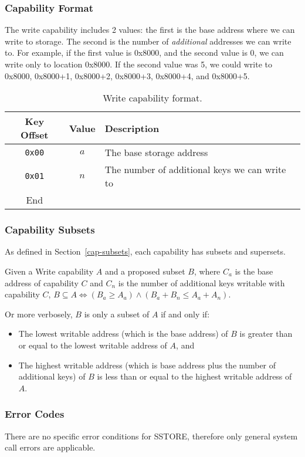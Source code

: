 \documentclass[english,a4paper]{article}
\let\oldparagraph\subsubsection
\renewcommand{\subsubsection}[1]{\oldparagraph{#1}\mbox{}}
\begin{document}
\subsubsection{Capability Format}
The write capability includes 2 values: the first is the base address where we
can write to storage. The second is the number of \emph{additional} addresses we
can write to. For example, if the first value is 0x8000, and the second value is
0, we can write only to location 0x8000. If the second value was 5, we could
write to 0x8000, 0x8000+1, 0x8000+2, 0x8000+3, 0x8000+4, and 0x8000+5.

\begin{table}[H]
  \caption{Write capability format.}
  \centering{}%
  \begin{tabularx}{\textwidth}{c|c|X}
    \hline
    Key Offset & Value & Description\\
    \hline
    \hline
    \texttt{0x00} & $a$ & The base storage address\\
    \texttt{0x01} & $n$ & The number of additional keys we can write to\\
    \hline
    End &  \\
    \hline
  \end{tabularx}
\end{table}

\subsubsection{Capability Subsets}
As defined in Section~\ref{cap-subsets}, each capability has subsets and
supersets.

Given a Write capability $A$ and a proposed subset $B$, where $C_a$ is the base
address of capability $C$ and $C_n$ is the number of additional keys writable
with capability $C$, $B \subseteq A \iff \left(B_a \geq A_a\right) \land
\left(B_a + B_n \leq A_a + A_n\right)$.

Or more verbosely, $B$ is only a subset of $A$ if and only if:
\begin{itemize}
  \item The lowest writable address (which is the base address) of $B$ is
  greater than or equal to the lowest writable address of $A$, and
  \item The highest writable address (which is base address plus the number of
  additional keys) of $B$ is less than or equal to the highest writable address
  of $A$.
\end{itemize}

\subsubsection{Error Codes}
There are no specific error conditions for SSTORE, therefore only general system
call errors are applicable.
\end{document}
